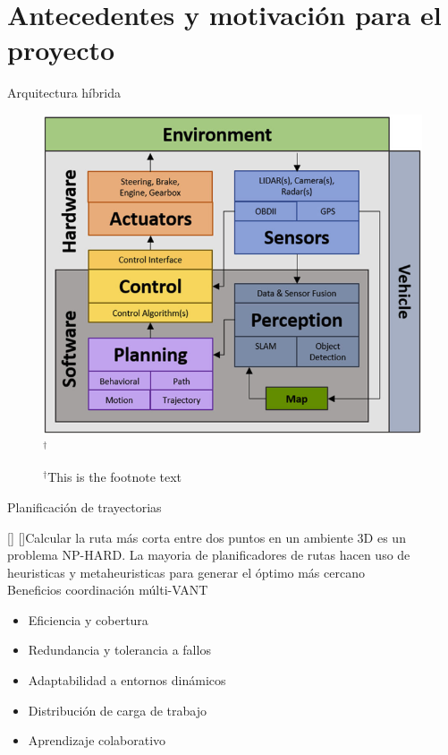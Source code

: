 \documentclass[
	12pt, %
	aspectratio=169, %
]{beamer}
\begin{document}
\section{Antecedentes y motivación para el proyecto}
\begin{frame}{Arquitectura híbrida}
  \begin{figure}
    \centering
    \includegraphics[scale=0.30]{control_autonomo2}$^\dag$
    \rule{0in}{1.2em}$^\dag$\scriptsize This is the footnote text\\
    
  \end{figure}
\end{frame}

\begin{frame}{Planificación de trayectorias}

  \cite{nphard}[] \cite{5427034}[]Calcular la ruta más corta entre dos puntos en un ambiente 3D es un problema NP-HARD. La mayoria de planificadores de rutas hacen uso de heuristicas y metaheuristicas para generar el óptimo más cercano \\
  \bigskip %
  Beneficios coordinación múlti-VANT
  \begin{itemize}
  \item Eficiencia y cobertura
  \item Redundancia y tolerancia a fallos
  \item Adaptabilidad a entornos dinámicos
  \item Distribución de carga de trabajo
  \item Aprendizaje colaborativo
  \end{itemize}
\end{frame}
\end{document}

